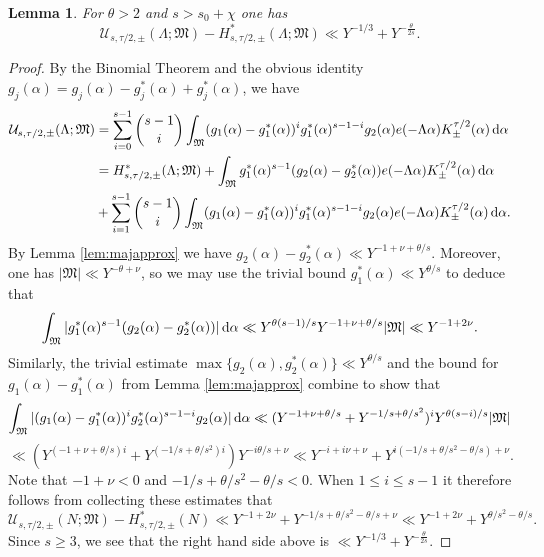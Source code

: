 \documentclass[11pt,reqno]{amsart}
\numberwithin{equation}{section}
\newtheorem{lemma}{Lemma}[section]
\renewcommand{\d}{\,{\rm d}}
\begin{document}
\begin{lemma} \label{lem:intmajapprox}
For $\theta > 2$ and $s > s_0+\chi$ one has 
\[ \mathcal{U}_{s,\tau/2,\pm}(\Lambda;\mathfrak{M})- H^*_{s,\tau/2,\pm}(\Lambda;\mathfrak{M}) \ll Y^{-1/3}+ Y^{-\frac{\theta}{2s}}. \]
\end{lemma}

\begin{proof} By the Binomial Theorem and the obvious identity $g_j(\alpha) = g_j(\alpha)-g_j^*(\alpha)+g_j^*(\alpha)$, we have 
\begin{align*}
\mathcal{U}_{s,\tau/2,\pm}(\Lambda;\mathfrak{M}) & = \sum_{i=0}^{s-1} \binom{s-1}{i}\int_{\mathfrak{M}} (g_1(\alpha)-g_1^*(\alpha))^{i}g_1^*(\alpha)^{s-1-i}g_2(\alpha)e(-\Lambda\alpha) K^{\tau/2}_{\pm}(\alpha)\d\alpha 
\\ & = H^*_{s,\tau/2,\pm}(\Lambda;\mathfrak{M})+\int_{\mathfrak{M}} g_1^*(\alpha)^{s-1}(g_2(\alpha)-g_2^*(\alpha))e(-\Lambda\alpha)K^{\tau/2}_{\pm}(\alpha) \d\alpha 
\\ & +\sum_{i=1}^{s-1} \binom{s-1}{i}\int_{\mathfrak{M}} (g_1(\alpha)-g_1^*(\alpha))^{i}g_1^*(\alpha)^{s-1-i}g_2(\alpha)e(-\Lambda\alpha)K^{\tau/2}_{\pm}(\alpha)\d\alpha. 
\end{align*}
By Lemma \ref{lem:majapprox} we have $g_2(\alpha)-g_2^*(\alpha) \ll Y^{-1+\nu+\theta/s}$. Moreover, one has $|\mathfrak{M}| \ll Y^{-\theta+\nu}$, so we may use the trivial bound $g_1^*(\alpha) \ll Y^{\theta/s}$ to deduce that 
\[ \int_{\mathfrak{M}} |g_1^*(\alpha)^{s-1}(g_2(\alpha)-g_2^*(\alpha))| \d\alpha \ll Y^{\theta(s-1)/s} Y^{-1+\nu+\theta/s}|\mathfrak{M}| \ll Y^{-1+2\nu}. \]
Similarly, the trivial estimate $\max \{g_2(\alpha),g_2^*(\alpha) \} \ll Y^{\theta/s}$ and the bound for $g_1(\alpha) -g_1^*(\alpha)$ from Lemma \ref{lem:majapprox} combine to show that 
\[ \int_{\mathfrak{M}} |(g_1(\alpha)-g_1^*(\alpha))^{i}g_2^*(\alpha)^{s-1-i}g_2(\alpha)|\d\alpha \ll (Y^{-1+\nu+\theta/s}+Y^{-1/s+\theta/s^2})^i Y^{\theta(s-i)/s}|\mathfrak{M}| \] 
\[ \ll (Y^{(-1+\nu+\theta/s)i}+Y^{(-1/s+\theta/s^2)i})Y^{-i\theta/s+\nu} \ll Y^{-i+i\nu+\nu}+Y^{i(-1/s+\theta/s^2-\theta/s)+\nu}. \] 
Note that $-1+\nu < 0$ and $-1/s+\theta/s^2-\theta/s <0$. When $1 \leq i \leq s-1$ it therefore follows from collecting these estimates that 
\[ \mathcal{U}_{s,\tau/2,\pm}(N; \mathfrak{M}) - H^*_{s,\tau/2,\pm}(N) \ll Y^{-1+2\nu}+Y^{-1/s+\theta/s^2-\theta/s+\nu} \ll Y^{-1+2\nu} + Y^{\theta/s^2-\theta/s}. \]
Since $s \geq 3$, we see that the right hand side above is $\ll Y^{-1/3}+Y^{-\frac{\theta}{2s}}$.
\end{proof}
\end{document}
